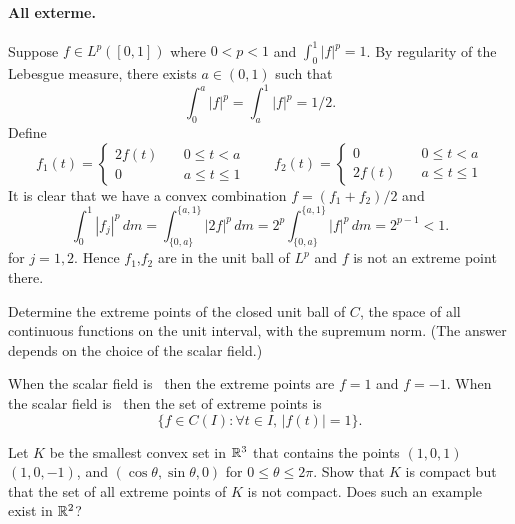 \begin{enumerate}
\paragraph{All exterme.}
Suppose \(f\in L^p([0,1])\) where \(0<p<1\) and \(\int_0^1 |f|^p = 1\).
By regularity of the Lebesgue measure, there exists \(a \in (0,1)\) such that 
\begin{equation*}
\int_0^a |f|^p = \int_a^1 |f|^p = 1/2.
\end{equation*}
Define
\begin{equation*}
f_1(t) = \left\{
  \begin{array}{ll}
  2f(t) \quad & 0 \leq t < a \\
  0 \quad & a \leq t \leq 1
  \end{array}
\right.
\qquad
f_2(t) = \left\{
  \begin{array}{ll}
  0 \quad & 0 \leq t < a \\
  2f(t) \quad & a \leq t \leq 1
  \end{array}
\right.
\end{equation*}
It is clear that we have a convex combination \(f = (f_1 + f_2)/2\) and
\begin{equation*}
\int_0^1 |f_j|^p\,dm 
= \int_{\{0,a\}}^{\{a,1\}} |2f|^p\,dm
= 2^p \int_{\{0,a\}}^{\{a,1\}} |f|^p\,dm 
= 2^{p-1} < 1.
\end{equation*}
for \(j=1,2\). Hence \(f_1\),\(f_2\) are in the unit ball of \(L^p\)
and $f$ is not an extreme point there.


\begin{excopy}
Determine the extreme points of the closed unit ball of $C$, the space of all
continuous functions on the unit interval, with the supremum norm.
(The answer depends on the choice of the scalar field.)
\end{excopy}

When the scalar field is \R\ then the extreme points are
\(f=1\) and \(f= -1\).
When the scalar field is \C\ then the set of extreme points is
\begin{equation*}
\{f\in C(I): \forall t\in I,\, |f(t)|=1\}.
\end{equation*}


\begin{excopy}Let $K$ be the smallest convex set in \(\mathbb{R}^3\) that contains
the points
\((1,0,1)\)
\((1,0,-1)\), and \((\cos \theta, \sin \theta, 0)\)
for \(0\leq \theta \leq 2\pi\).
Show that $K$ is compact but that the set of all extreme points of $K$ is not
compact. Does such an example exist in \(\mathbb{R}^2\)?
\end{excopy}


\end{enumerate}
